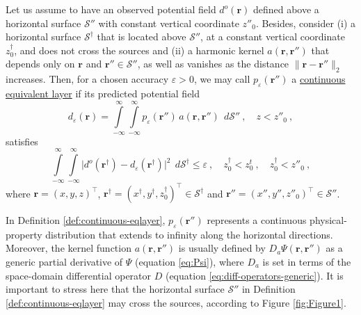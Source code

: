 \begin{definition}
	Let us assume to have an observed potential field $d^{o}(\mathbf{r})$ defined above 
	a horizontal surface $\mathcal{S}''$ with constant vertical coordinate $z''_{0}$. 
	Besides, consider (i) a horizontal surface $\mathcal{S}^{\dagger}$ that is located above 
	$\mathcal{S}''$, at a constant vertical coordinate $z^{\dagger}_{0}$, 
	and does not cross the sources and (ii) a harmonic kernel 
	$a(\mathbf{r}, \mathbf{r}'')$ that depends only on $\mathbf{r}$ and $\mathbf{r}'' \in \mathcal{S}''$, as well as 
	vanishes as the distance $\| \mathbf{r} - \mathbf{r}'' \|_{2}$ increases. 
	Then, for a chosen accuracy $\varepsilon > 0$, we may call $p_{\varepsilon}(\mathbf{r}'')$ 
	a \underline{continuous equivalent layer} if its predicted potential field 
	\begin{equation}
		d_{\varepsilon}(\mathbf{r})
		= \int\limits_{-\infty}^{\infty}\int\limits_{-\infty}^{\infty}
		p_{\varepsilon}(\mathbf{r}'') \, a(\mathbf{r}, \mathbf{r}'') \:\: d\mathcal{S}''
		\: , \quad z < z''_{0} \: ,
		\label{eq:predicted-data-continuous-layer}
	\end{equation}
	satisfies 
	\begin{equation}
		\int\limits_{-\infty}^{\infty} \int\limits_{-\infty}^{\infty}
		\vert d^{o}(\mathbf{r}^{\dagger}) - 
		d_{\varepsilon}(\mathbf{r}^{\dagger}) \vert^{2}
		\:\: d\mathcal{S}^{\dagger} \le \varepsilon \: ,
		\quad z^{\dagger}_{0} < z^{t}_{0} \: , \quad z^{\dagger}_{0} < z''_{0} \: ,
		\label{eq:epsilon-bound-data}
	\end{equation}
	where $\mathbf{r} = (x, y, z)^{\top}$, 
	$\mathbf{r}^{\dagger} = (x^{\dagger}, y^{\dagger}, z^{\dagger}_{0})^{\top} \in \mathcal{S}^{\dagger}$ 
	and $\mathbf{r}'' = (x'', y'', z''_{0})^{\top} \in \mathcal{S}''$.
	\label{def:continuous-eqlayer}
\end{definition}

In Definition \ref{def:continuous-eqlayer}, $p_{\varepsilon}(\mathbf{r}'')$ represents a continuous 
physical-property distribution that extends to infinity along the horizontal directions. 
Moreover, the kernel function $a(\mathbf{r}, \mathbf{r}'')$ is usually defined by $D_{a} \Psi(\mathbf{r}, \mathbf{r}'')$ 
as a generic partial derivative of $\Psi$ (equation \ref{eq:Psi}),
where $D_{a}$ is set in terms of the space-domain differential operator 
$D$ (equation \ref{eq:diff-operators-generic}).
It is important to stress here that the horizontal surface $\mathcal{S}''$ in Definition \ref{def:continuous-eqlayer} 
may cross the sources, according to Figure \ref{fig:Figure1}.

